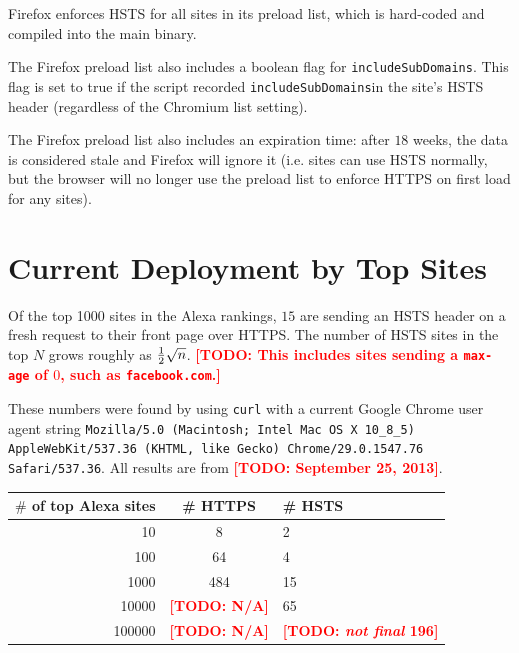 \documentclass[conference]{./IEEEtran}
\newcommand{\todo}[1]{\textcolor{red}{\textbf{[TODO: #1]}}}
\newcommand{\td}[2]{\textcolor{red}{\textbf{[TODO: {\it{#1}} #2]}}}
\newcommand{\site}[1]{\texttt{#1}}
\newcommand{\code}[1]{\texttt{#1}}
\newcommand{\iSD}{{\code{includeSubDomains}}}
\theoremstyle{plain}
\begin{document}
Firefox enforces HSTS for all sites in its preload list, which is hard-coded and compiled into the main binary.

The Firefox preload list also includes a boolean flag for \iSD. This flag is set to true if the script recorded \iSD in the site's HSTS header (regardless of the Chromium list setting).

The Firefox preload list also includes an expiration time: after $18$ weeks, the data is considered stale and Firefox will ignore it (i.e. sites can use HSTS normally, but the browser will no longer use the preload list to enforce HTTPS on first load for any sites)\cite{firefox-cron-expiration}.

\section{Current Deployment by Top Sites}

Of the top 1000 sites in the Alexa rankings, $15$ are sending an HSTS header on a fresh request to their front page over HTTPS. The number of HSTS sites in the top $N$ grows roughly as ${1 \over 2}\sqrt{n}$. \todo{This includes sites sending a \code{max-age} of $0$, such as \site{facebook.com}.}

These numbers were found by using \code{curl} with a current Google Chrome user agent string \code{Mozilla/5.0 (Macintosh; Intel Mac OS X 10\_8\_5) AppleWebKit/537.36 (KHTML, like Gecko) Chrome/29.0.1547.76 Safari/537.36}. All results are from \todo{September 25, 2013}.

\begin{table}[htdp]
\label{alexa_table}
\begin{center}
\begin{tabular}{|r|c|l|}
\hline
$\#$ of top Alexa sites & \# HTTPS & \# HSTS\\
\hline
10 & 8 & 2 \\
\hline
100 & 64 & 4 \\	
\hline
1000 & 484 &15 \\
\hline
10000 & \todo{N/A} & 65\\
\hline
100000 & \todo{N/A} & \td{not final}{196}\\
\hline
\end{tabular}
\end{center}
\end{table}%
\end{document}
